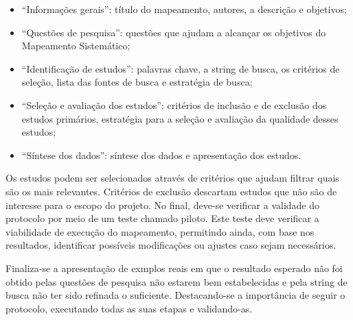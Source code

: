 \begin{itemize}
  \item ``Informações gerais'': título do mapeamento, autores, a descrição e objetivos;
  \item ``Questões de pesquisa'': questões que ajudam a alcançar os objetivos do Mapeamento Sistemático;
  \item ``Identificação de estudos'': palavras chave, a string de busca, os critérios de seleção, lista das fontes de busca e estratégia de busca;
  \item ``Seleção e avaliação dos estudos'': critérios de inclusão e de exclusão dos estudos primários, estratégia para a seleção e avaliação da qualidade desses estudos;
  \item ``Síntese dos dados'': síntese dos dados e apresentação dos estudos.
\end{itemize}

Os estudos podem ser selecionados através de critérios que ajudam filtrar quais são os mais relevantes. Critérios de exclusão descartam estudos que não são de interesse para o escopo do projeto. No final, deve-se verificar a validade do protocolo por meio de um teste chamado piloto. Este teste deve verificar a viabilidade de execução do mapeamento, permitindo ainda, com base nos resultados, identificar possíveis modificações ou ajustes caso sejam necessários.

Finaliza-se a apresentação de exmplos reais em que o resultado esperado não foi obtido pelas questões de pesquisa não estarem bem estabelecidas e pela string de busca não ter sido refinada o suficiente. Destacando-se a importância de seguir o protocolo, executando todas as suas etapas e validando-as.
